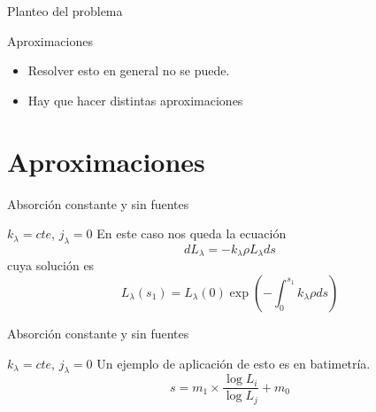 \documentclass[handout]{beamer}
\begin{document}
\begin{frame}{Planteo del problema}
  \begin{alertblock}{Aproximaciones}
    \begin{itemize}[<+->]
      \item Resolver esto en general no se puede.
      \item Hay que hacer distintas aproximaciones
    \end{itemize}
  \end{alertblock}
\end{frame}

\section{Aproximaciones}

\begin{frame}{Absorción constante y sin fuentes}
  \begin{exampleblock}{$k_\lambda = cte$, $j_\lambda = 0$}
    En este caso nos queda la ecuación
    \begin{equation}
        dL_\lambda = -k_\lambda \rho L_\lambda ds
    \end{equation}
    \pause cuya solución es
    \begin{equation}
        L_\lambda(s_1) = L_\lambda(0) \exp\left( -\int_0^{s_1} k_\lambda \rho ds \right)
    \end{equation}
  \end{exampleblock}
\end{frame}

\begin{frame}{Absorción constante y sin fuentes}
  \begin{exampleblock}{$k_\lambda = cte$, $j_\lambda = 0$}
    Un ejemplo de aplicación de esto es en batimetría.
    \begin{equation}
      s = m_1\times \frac{\log L_i}{\log L_j}+m_0
    \end{equation}
  \end{exampleblock}
\end{frame}
\end{document}
